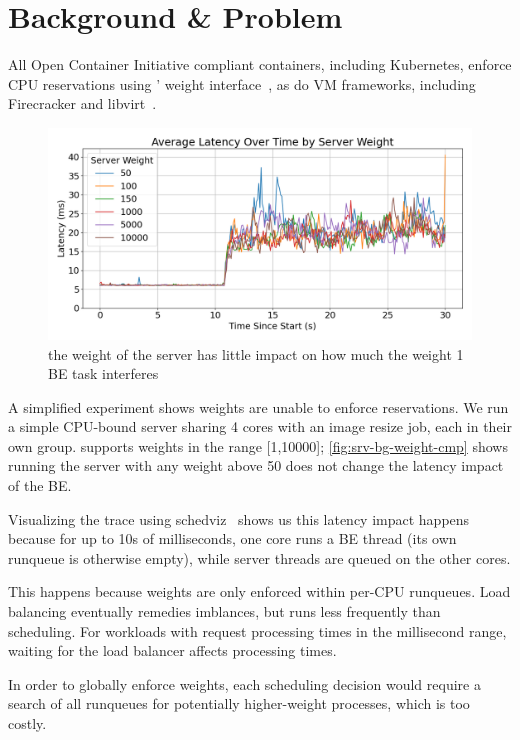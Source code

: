 
\section{Background \& Problem}

All Open Container Initiative compliant containers, including Kubernetes,
enforce CPU reservations using \cgroups{}' weight interface~\cite{oci-cgroups,
docker-docs-cgroups, container-isolation-article}, as do VM frameworks,
including Firecracker and
libvirt~\cite{firecracker-cgroups,afaas,libvirt-cgroups}. 

\begin{figure}[t]
    \centering
    \includegraphics[width=\columnwidth]{graphs/srv-bg-weight-cmp-low.png}
    \caption{ the weight of the server has little impact on how much the
    weight 1 BE task interferes }\label{fig:srv-bg-weight-cmp}
\end{figure}


A simplified experiment shows \cgroups{} weights are unable to enforce
reservations. We run a simple CPU-bound server sharing 4 cores with an image
resize job, each in their own group. \cgroups{} supports weights in the range
[1,10000]; \autoref{fig:srv-bg-weight-cmp} shows running the server with any
weight above 50 does not change the latency impact of the BE.

Visualizing the trace using schedviz~\cite{schedviz-tool} shows us this latency
impact happens because for up to 10s of milliseconds, one core runs a BE thread
(its own runqueue is otherwise empty), while server threads are queued on the
other cores.

This happens because weights are only enforced within per-CPU runqueues. Load
balancing eventually remedies imblances, but runs less frequently than
scheduling. For workloads with request processing times in the millisecond
range, waiting for the load balancer affects processing times.

In order to globally enforce weights, each scheduling decision would require a
search of all runqueues for potentially higher-weight processes, which is too
costly. 




